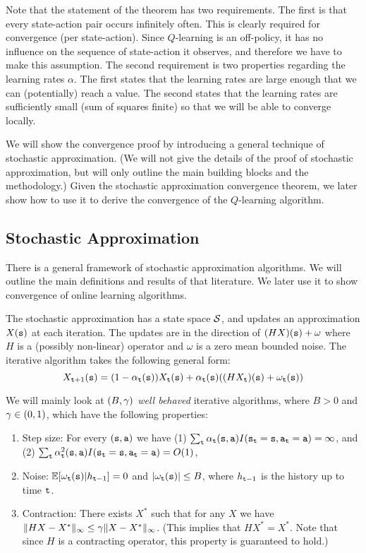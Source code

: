 Note that the statement of the theorem has two requirements. The
first is that every state-action pair occurs infinitely often.
This is clearly required for convergence (per state-action). Since
$Q$-learning is an off-policy, it has no influence on the sequence
of state-action it observes, and therefore we have to make this
assumption. The second requirement is two properties regarding the
learning rates $\alpha$. The first states that the learning rates
are large enough that we can (potentially) reach a value. The
second states that the learning rates are sufficiently small (sum of
squares finite) so that we will be able to converge locally.

We will show the convergence proof by introducing a general technique
of stochastic approximation. (We will not give the details of the
proof of stochastic approximation, but will only outline the main
building blocks and the methodology.) Given the stochastic
approximation convergence theorem, we later show how to use it to
derive the convergence of the $Q$-learning algorithm.


\subsection{Stochastic Approximation}
\label{sec:stochastic-approximation}

There is a general framework of stochastic approximation algorithms.
We will outline the main definitions and results of that literature.
We later use it to show convergence of online learning algorithms.

The stochastic approximation has a state space $\mathcal{S}$, and
updates an approximation $X({\tt s})$ at each iteration. The updates
are in the direction of $(HX)({\tt s})+\omega$ where $H$ is a (possibly
non-linear) operator and $\omega$ is a zero mean bounded noise. The
iterative algorithm takes the following general form:
\[
X_{{\tt t}+1}({\tt s}) =
(1-\alpha_{\tt t}({\tt s}))X_{\tt t}({\tt s})+\alpha_{\tt t}({\tt s})((HX_{\tt t})({\tt s})+\omega_{\tt t}({\tt s}))
\]

We will mainly look at {\em $(B,\gamma)$ well behaved} iterative
algorithms, where $B>0$ and $\gamma\in(0,1)$, which have the
following properties:
\begin{enumerate}
\item Step size: For every $({\tt s},{\tt a})$ we have (1) $\sum_{\tt t}
\alpha_{\tt t}({\tt s},{\tt a})
I({\tt s}_{\tt t}={\tt s},{\tt a}_{\tt t}={\tt a})=\infty $, and (2)
$\sum_{\tt t} \alpha_{\tt t}^2({\tt s},{\tt a})
I({\tt s}_{\tt t}={\tt s},{\tt a}_{\tt t}={\tt a})=O(1)$,
\item Noise: $\mathbb{E}[\omega_{\tt t}({\tt s})|h_{{\tt t}-1}]=0$ and $|\omega_{\tt t}({\tt s})|\leq B$, where
$h_{{\tt t}-1}$ is the history up to time ${\tt t}$.
\item Contraction: There exists $X^*$ such that for any $X$ we have $\|HX-X^*\|_\infty
\leq \gamma \|X-X^*\|_\infty$. (This implies that $HX^*=X^*$.
Note that since $H$ is a contracting operator, this property is
guaranteed to hold.)
\end{enumerate}


